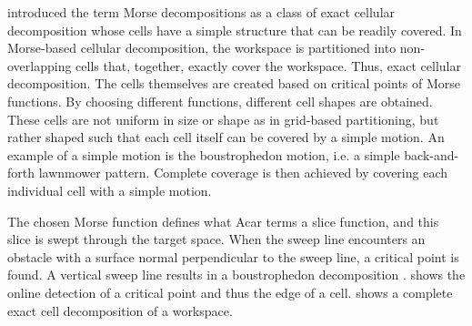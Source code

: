 \citet{acar2002morse} introduced the term Morse decompositions as a class of exact cellular decomposition whose cells have a simple structure that can be readily covered. In Morse-based cellular decomposition, the workspace is partitioned into non-overlapping cells that, together, exactly cover the workspace. Thus, exact cellular decomposition. The cells themselves are created based on critical points of Morse functions. By choosing different functions, different cell shapes are obtained. These cells are not uniform in size or shape as in grid-based partitioning, but rather shaped such that each cell itself can be covered by a simple motion. An example of a simple motion is the boustrophedon motion, i.e. a simple back-and-forth lawnmower pattern. Complete coverage is then achieved by covering each individual cell with a simple motion.



The chosen Morse function defines what Acar terms a slice function, and this slice is swept through the target space. When the sweep line encounters an obstacle with a surface normal perpendicular to the sweep line, a critical point is found. A vertical sweep line results in a boustrophedon decomposition \citep{choset2000exact}.  shows the online detection of a critical point and thus the edge of a cell.  shows a complete exact cell decomposition of a workspace.

